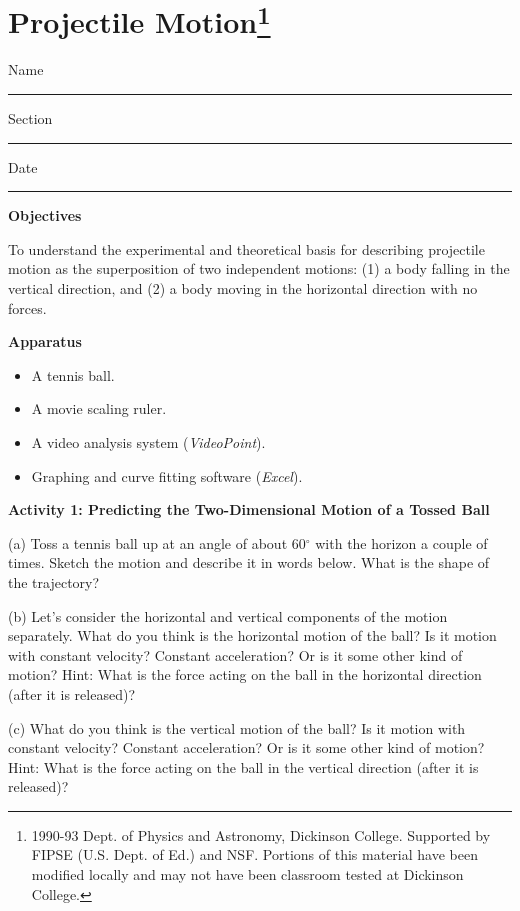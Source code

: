 
\section{Projectile Motion\footnote{
1990-93 Dept. of Physics and Astronomy, Dickinson College. Supported by FIPSE
(U.S. Dept. of Ed.) and NSF. Portions of this material have been modified locally
and may not have been classroom tested at Dickinson College.
}}

Name \rule{2.0in}{0.1pt}\hfill{}Section \rule{1.0in}{0.1pt}\hfill{}Date \rule{1.0in}{0.1pt}

\textbf{Objectives }

To understand the experimental and theoretical basis for describing projectile
motion as the superposition of two independent motions: (1) a body falling in
the vertical direction, and (2) a body moving in the horizontal direction with
no forces.

\textbf{Apparatus}

\begin{itemize}
\item A tennis ball. 
\item A movie scaling ruler.
\item A video analysis system (\textit{VideoPoint}). 
\item Graphing and curve fitting software (\textit{Excel}).
\end{itemize}
\textbf{Activity 1: Predicting the Two-Dimensional Motion of a Tossed Ball }

(a) Toss a tennis ball up at an angle of about 60\( ^{\circ } \) with the horizon
a couple of times. Sketch the motion and describe it in words below. What is
the shape of the trajectory?
\vspace{20mm}

(b) Let's consider the horizontal and vertical components of the motion separately.
What do you think is the horizontal motion of the ball? Is it motion with constant
velocity? Constant acceleration? Or is it some other kind of motion? Hint: What
is the force acting on the ball in the horizontal direction (after it is released)?
\vspace{20mm}

(c) What do you think is the vertical motion of the ball? Is it motion with
constant velocity? Constant acceleration? Or is it some other kind of motion?
Hint: What is the force acting on the ball in the vertical direction (after
it is released)?
\vspace{20mm}


